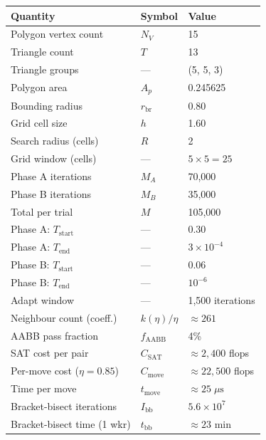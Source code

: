 \documentclass[11pt,oneside]{article}
\begin{document}
\begin{center}
\begin{tabular}{lll}
\toprule
Quantity & Symbol & Value \\
\midrule
Polygon vertex count        & $N_V$               & 15 \\
Triangle count              & $T$                 & 13 \\
Triangle groups             & ---                 & (5, 5, 3) \\
Polygon area                & $A_p$               & 0.245625 \\
Bounding radius             & $r_{\mathrm{br}}$   & 0.80 \\
Grid cell size              & $h$                 & 1.60 \\
Search radius (cells)       & $R$                 & 2 \\
Grid window (cells)         & ---                 & $5\times 5 = 25$ \\
\midrule
Phase A iterations          & $M_A$               & 70{,}000 \\
Phase B iterations          & $M_B$               & 35{,}000 \\
Total per trial             & $M$                 & 105{,}000 \\
Phase A: $T_{\mathrm{start}}$ & ---              & 0.30 \\
Phase A: $T_{\mathrm{end}}$   & ---              & $3\times10^{-4}$ \\
Phase B: $T_{\mathrm{start}}$ & ---              & 0.06 \\
Phase B: $T_{\mathrm{end}}$   & ---              & $10^{-6}$ \\
Adapt window               & ---                 & 1{,}500 iterations \\
\midrule
Neighbour count (coeff.)   & $k(\eta)/\eta$      & $\approx 261$ \\
AABB pass fraction         & $f_{\mathrm{AABB}}$ & 4\% \\
SAT cost per pair          & $C_{\mathrm{SAT}}$  & $\approx 2{,}400$ flops \\
Per-move cost ($\eta=0.85$)& $C_{\mathrm{move}}$ & $\approx 22{,}500$ flops \\
Time per move              & $t_{\mathrm{move}}$ & $\approx 25\;\mu\mathrm{s}$ \\
\midrule
Bracket-bisect iterations  & $I_{\mathrm{bb}}$   & $5.6\times10^7$ \\
Bracket-bisect time (1 wkr)& $t_{\mathrm{bb}}$   & $\approx 23$ min \\

\end{tabular}
\end{center}
\end{document}
